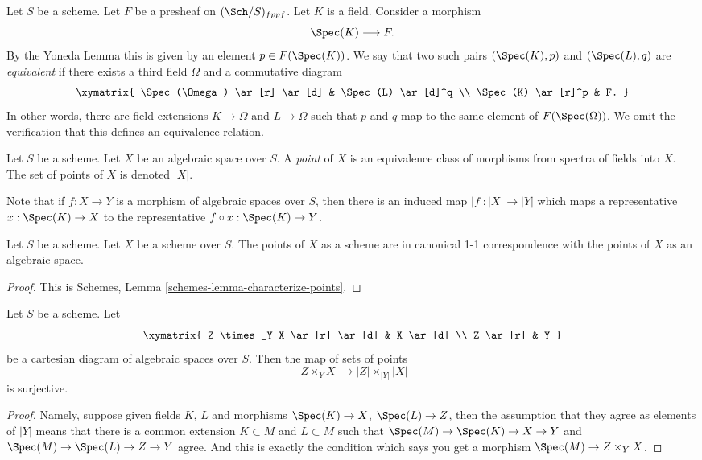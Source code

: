 \medskip\noindent
Let $S$ be a scheme.
Let $F$ be a presheaf on $(\Sch/S)_{fppf}$.
Let $K$ is a field. Consider a morphism
$$
\Spec(K) \longrightarrow F.
$$
By the Yoneda Lemma this is given by an
element $p \in F(\Spec(K))$. We say that two such
pairs $(\Spec(K), p)$ and $(\Spec(L), q)$
are {\it equivalent} if there exists
a third field $\Omega$ and a commutative diagram
$$
\xymatrix{
\Spec(\Omega) \ar[r] \ar[d] &
\Spec(L) \ar[d]^q \\
\Spec(K) \ar[r]^p &
F.
}
$$
In other words, there are field extensions
$K \to \Omega$ and $L \to \Omega$ such that
$p$ and $q$ map to the same element
of $F(\Spec(\Omega))$. We omit the verification that this
defines an equivalence relation.

\begin{definition}
\label{definition-points}
Let $S$ be a scheme. Let $X$ be an algebraic space over $S$.
A {\it point} of $X$ is an equivalence class of morphisms
from spectra of fields into $X$.
The set of points of $X$ is denoted $|X|$.
\end{definition}

\noindent
Note that if $f : X \to Y$ is a morphism of algebraic spaces
over $S$, then there is an induced map $|f| : |X| \to |Y|$ which
maps a representative $x : \Spec(K) \to X$ to the representative
$f \circ x : \Spec(K) \to Y$.

\begin{lemma}
\label{lemma-scheme-points}
Let $S$ be a scheme. Let $X$ be a scheme over $S$.
The points of $X$ as a scheme are in canonical 1-1 correspondence
with the points of $X$ as an algebraic space.
\end{lemma}

\begin{proof}
This is Schemes, Lemma \ref{schemes-lemma-characterize-points}.
\end{proof}

\begin{lemma}
\label{lemma-points-cartesian}
Let $S$ be a scheme. Let
$$
\xymatrix{
Z \times_Y X \ar[r] \ar[d] & X \ar[d] \\
Z \ar[r] & Y
}
$$
be a cartesian diagram of algebraic spaces over $S$. Then the map of sets
of points
$$
|Z \times_Y X|
\longrightarrow
|Z| \times_{|Y|} |X|
$$
is surjective.
\end{lemma}

\begin{proof}
Namely, suppose given fields $K$, $L$ and morphisms
$\Spec(K) \to X$, $\Spec(L) \to Z$, then the
assumption that they agree as elements of $|Y|$ means that
there is a common extension $K \subset M$ and $L \subset M$
such that
$\Spec(M) \to \Spec(K) \to X \to Y$ and
$\Spec(M) \to \Spec(L) \to Z \to Y$ agree.
And this is exactly the condition which says you get a
morphism $\Spec(M) \to Z \times_Y X$.
\end{proof}

